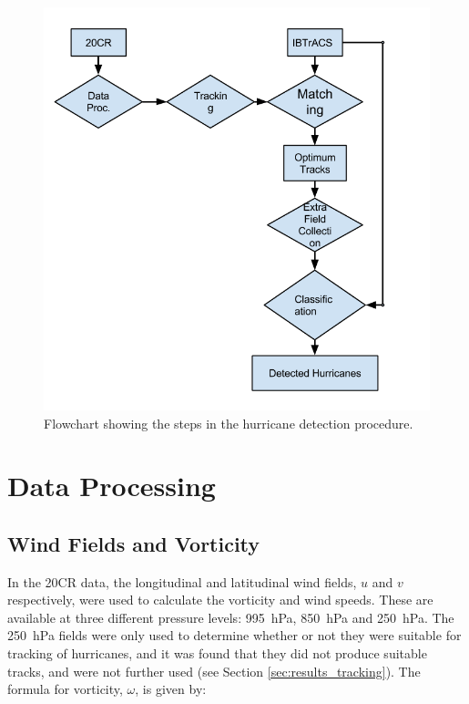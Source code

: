 \documentclass[pdftex,12pt,a4paper]{report}
\begin{document}
\begin{figure}[hbp]
    \centering
    \includegraphics[width=\textwidth]{figures/hurricane_detection_procedure}
    \caption{Flowchart showing the steps in the hurricane detection procedure.}
    \label{fig:hurricane_detection_proc}
\end{figure}

\section{Data Processing}

\subsection{Wind Fields and Vorticity}

In the 20CR data, the longitudinal and latitudinal wind fields, $u$ and $v$ respectively, were used
to calculate the vorticity and wind speeds. These are available at three different pressure levels:
\SI{995}{hPa}, \SI{850}{hPa} and \SI{250}{hPa}. The \SI{250}{hPa} fields were only used to determine
whether or not they were suitable for tracking of hurricanes, and it was found that they did not
produce suitable tracks, and were not further used (see Section \ref{sec:results_tracking}). The
formula for vorticity, $\omega$, is given by:
\end{document}
